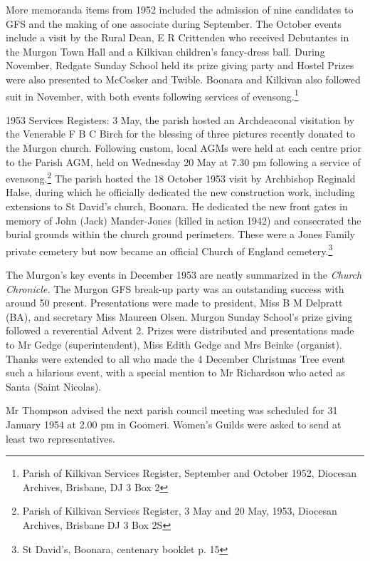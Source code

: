 More memoranda items from 1952 included the admission of nine candidates to GFS and the making of one associate during September. The October events include a visit by the Rural Dean, E R Crittenden who received Debutantes in the Murgon Town Hall and a Kilkivan children's fancy-dress ball. During November, Redgate Sunday School held its prize giving party and Hostel Prizes were also presented to McCosker and Twible. Boonara and Kilkivan also followed suit in November, with both events following services of evensong.\footnote{Parish of Kilkivan Services Register, September and October 1952, Diocesan Archives, Brisbane, DJ 3 Box 2}


1953 Services Registers: 3 May, the parish hosted an Archdeaconal visitation by the Venerable F B C Birch for the blessing of three pictures recently donated to the Murgon church. Following custom, local AGMs were held at each centre prior to the Parish AGM, held on Wednesday 20 May at 7.30 pm following a service of evensong.\footnote{Parish of Kilkivan Services Register, 3 May and 20 May, 1953, Diocesan Archives, Brisbane DJ 3 Box 2S} The parish hosted the 18 October 1953 visit by Archbishop Reginald Halse, during which he officially dedicated the new construction work, including extensions to St David's church, Boonara. He dedicated the new front gates in memory of John (Jack) Mander-Jones (killed in action 1942) and consecrated the burial grounds within the church ground perimeters. These were a Jones Family private cemetery but now became an official Church of England cemetery.\footnote{St David's, Boonara, centenary booklet p. 15}


The Murgon's key events in December 1953 are neatly summarized in the \emph{Church Chronicle.} The Murgon GFS break-up party was an outstanding success with around 50 present. Presentations were made to president, Miss B M Delpratt (BA), and secretary Miss Maureen Olsen. Murgon Sunday School's prize giving followed a reverential Advent 2. Prizes were distributed and presentations made to Mr Gedge (superintendent), Miss Edith Gedge and Mrs Beinke (organist). Thanks were extended to all who made the 4 December Christmas Tree event such a hilarious event, with a special mention to Mr Richardson who acted as Santa (Saint Nicolas).



Mr Thompson advised the next parish council meeting was scheduled for 31 January 1954 at 2.00 pm in Goomeri. Women's Guilds were asked to send at least two representatives.




